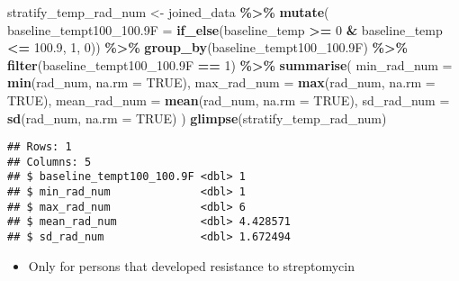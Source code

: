 \documentclass[
]{article}
\newenvironment{Shaded}{\begin{snugshade}}{\end{snugshade}}
\newcommand{\AttributeTok}[1]{\textcolor[rgb]{0.13,0.29,0.53}{#1}}
\newcommand{\ConstantTok}[1]{\textcolor[rgb]{0.56,0.35,0.01}{#1}}
\newcommand{\DecValTok}[1]{\textcolor[rgb]{0.00,0.00,0.81}{#1}}
\newcommand{\FloatTok}[1]{\textcolor[rgb]{0.00,0.00,0.81}{#1}}
\newcommand{\FunctionTok}[1]{\textcolor[rgb]{0.13,0.29,0.53}{\textbf{#1}}}
\newcommand{\NormalTok}[1]{#1}
\newcommand{\OtherTok}[1]{\textcolor[rgb]{0.56,0.35,0.01}{#1}}
\newcommand{\SpecialCharTok}[1]{\textcolor[rgb]{0.81,0.36,0.00}{\textbf{#1}}}
\providecommand{\tightlist}{%
  \setlength{\itemsep}{0pt}\setlength{\parskip}{0pt}}
\begin{document}
\begin{Shaded}
\begin{Highlighting}[]
\NormalTok{stratify\_temp\_rad\_num }\OtherTok{\textless{}{-}}\NormalTok{ joined\_data }\SpecialCharTok{\%\textgreater{}\%}
  \FunctionTok{mutate}\NormalTok{(}
    \AttributeTok{baseline\_tempt100\_100.9F =} 
      \FunctionTok{if\_else}\NormalTok{(baseline\_temp }\SpecialCharTok{\textgreater{}=} \DecValTok{0} \SpecialCharTok{\&}\NormalTok{ baseline\_temp }\SpecialCharTok{\textless{}=} \FloatTok{100.9}\NormalTok{, }\DecValTok{1}\NormalTok{, }\DecValTok{0}\NormalTok{)) }\SpecialCharTok{\%\textgreater{}\%}
  \FunctionTok{group\_by}\NormalTok{(baseline\_tempt100\_100}\FloatTok{.9}\NormalTok{F) }\SpecialCharTok{\%\textgreater{}\%} 
  \FunctionTok{filter}\NormalTok{(baseline\_tempt100\_100}\FloatTok{.9}\NormalTok{F }\SpecialCharTok{==} \DecValTok{1}\NormalTok{) }\SpecialCharTok{\%\textgreater{}\%}
  \FunctionTok{summarise}\NormalTok{(}
    \AttributeTok{min\_rad\_num  =} \FunctionTok{min}\NormalTok{(rad\_num, }\AttributeTok{na.rm =} \ConstantTok{TRUE}\NormalTok{),}
    \AttributeTok{max\_rad\_num  =} \FunctionTok{max}\NormalTok{(rad\_num, }\AttributeTok{na.rm =} \ConstantTok{TRUE}\NormalTok{),}
    \AttributeTok{mean\_rad\_num =} \FunctionTok{mean}\NormalTok{(rad\_num, }\AttributeTok{na.rm =} \ConstantTok{TRUE}\NormalTok{),}
    \AttributeTok{sd\_rad\_num   =} \FunctionTok{sd}\NormalTok{(rad\_num, }\AttributeTok{na.rm =} \ConstantTok{TRUE}\NormalTok{)}
\NormalTok{  )}
\FunctionTok{glimpse}\NormalTok{(stratify\_temp\_rad\_num)}
\end{Highlighting}
\end{Shaded}

\begin{verbatim}
## Rows: 1
## Columns: 5
## $ baseline_tempt100_100.9F <dbl> 1
## $ min_rad_num              <dbl> 1
## $ max_rad_num              <dbl> 6
## $ mean_rad_num             <dbl> 4.428571
## $ sd_rad_num               <dbl> 1.672494
\end{verbatim}

\begin{itemize}
\tightlist
\item
  Only for persons that developed resistance to streptomycin
\end{itemize}
\end{document}
